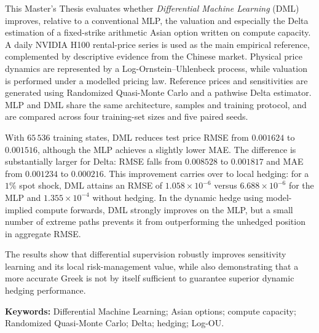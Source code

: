 This Master's Thesis evaluates whether \textit{Differential Machine Learning} (DML) improves, relative to a conventional MLP, the valuation and especially the Delta estimation of a fixed-strike arithmetic Asian option written on compute capacity. A daily NVIDIA H100 rental-price series is used as the main empirical reference, complemented by descriptive evidence from the Chinese market. Physical price dynamics are represented by a Log-Ornstein--Uhlenbeck process, while valuation is performed under a modelled pricing law. Reference prices and sensitivities are generated using Randomized Quasi-Monte Carlo and a pathwise Delta estimator. MLP and DML share the same architecture, samples and training protocol, and are compared across four training-set sizes and five paired seeds.

With $65\,536$ training states, DML reduces test price RMSE from $0.001624$ to $0.001516$, although the MLP achieves a slightly lower MAE. The difference is substantially larger for Delta: RMSE falls from $0.008528$ to $0.001817$ and MAE from $0.001234$ to $0.000216$. This improvement carries over to local hedging: for a $1\%$ spot shock, DML attains an RMSE of $1.058\times10^{-6}$ versus $6.688\times10^{-6}$ for the MLP and $1.355\times10^{-4}$ without hedging. In the dynamic hedge using model-implied compute forwards, DML strongly improves on the MLP, but a small number of extreme paths prevents it from outperforming the unhedged position in aggregate RMSE.

The results show that differential supervision robustly improves sensitivity learning and its local risk-management value, while also demonstrating that a more accurate Greek is not by itself sufficient to guarantee superior dynamic hedging performance.

\vspace{0.5em}
\noindent\textbf{Keywords:} Differential Machine Learning; Asian options; compute capacity; Randomized Quasi-Monte Carlo; Delta; hedging; Log-OU.
